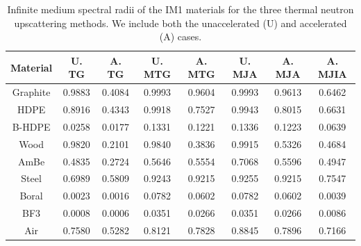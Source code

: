 \begin{table}
\caption{Infinite medium spectral radii of the IM1 materials for the three thermal neutron upscattering methods. We include both the unaccelerated (U) and accelerated (A) cases.}
\centering
\def\arraystretch{1.2}
\begin{tabular}{|c||c|c||c|c||c|c|c|}
\hline
Material  & U. TG & A. TG & U. MTG & A. MTG & U. MJA & A. MJA & A. MJIA \\ \hline
Graphite & 0.9883&0.4084&0.9993&0.9604&0.9993&0.9613&0.6462\\
HDPE &0.8916&0.4343&0.9918&0.7527&0.9943&0.8015&0.6631\\
B-HDPE &0.0258&0.0177&0.1331&0.1221&0.1336&0.1223&0.0639 \\
Wood & 0.9820&0.2101&0.9840&0.3836&0.9915&0.5326&0.4684 \\
AmBe  &0.4835&0.2724&0.5646&0.5554&0.7068&0.5596&0.4947 \\
Steel  & 0.6989&0.5809&0.9243&0.9215&0.9255&0.9215&0.7547\\
Boral  & 0.0023&0.0016&0.0782&0.0602&0.0782&0.0602&0.0039 \\
BF3   & 0.0008&0.0006&0.0351&0.0266&0.0351&0.0266&0.0086 \\
Air     &0.7580&0.5282&0.8121&0.7828&0.8845&0.7896&0.7166\\
\hline
\end{tabular}
\label{tab::IM1_inf_med_SR}
\end{table}


